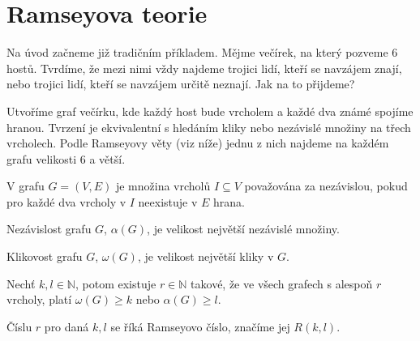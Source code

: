 \section{Ramseyova teorie}
\begin{t_example}
  Na úvod začneme již tradičním příkladem. Mějme večírek, na který pozveme 6 hostů. Tvrdíme, že mezi nimi vždy najdeme trojici lidí, kteří se navzájem znají, nebo trojici lidí, kteří se navzájem určitě neznají. Jak na to přijdeme?

  Utvoříme graf večírku, kde každý host bude vrcholem a každé dva známé spojíme hranou. Tvrzení je ekvivalentní s hledáním kliky nebo nezávislé množiny na třech vrcholech. Podle Ramseyovy věty (viz níže) jednu z nich najdeme na každém grafu velikosti 6 a větší.
\end{t_example}

\begin{t_definition}
  V grafu $G=(V,E)$ je množina vrcholů $I\subseteq V$ považována za nezávislou, pokud pro každé dva vrcholy v $I$ neexistuje v $E$ hrana.
\end{t_definition}

\begin{t_definition}
  Nezávislost grafu $G$, $\alpha(G)$, je velikost největší nezávislé množiny.
\end{t_definition}

\begin{t_definition}
  Klikovost grafu $G$, $\omega(G)$, je velikost největší kliky v $G$.
\end{t_definition}

\begin{t_theorem}
  Nechť $k,l\in\mathbb{N}$, potom existuje $r\in\mathbb{N}$ takové, že ve všech grafech s alespoň $r$ vrcholy, platí $\omega(G)\geq k$ nebo $\alpha(G)\geq l$.
\end{t_theorem}

\begin{t_remark}
  Číslu $r$ pro daná $k, l$ se říká Ramseyovo číslo, značíme jej $R(k, l)$.
\end{t_remark}

